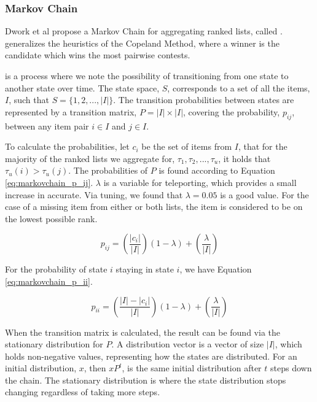 \subsubsection{Markov Chain}\label{sec:markovchain}

Dwork et al propose a Markov Chain for aggregating ranked lists, called \MC\cite{rank:aggregation}. \MC generalizes the heuristics of the Copeland Method, where a winner is the candidate which wins the most pairwise contests\cite{saari1996}.

\MC is a process where we note the possibility of transitioning from one state to another state over time. The \MC state space, $S$, corresponds to a set of all the items, $I$, such that $S = \{1, 2,..., |I|\}$. The transition probabilities between states are represented by a transition matrix, $P = |I| \times |I|$, covering the probability, $p_{ij}$, between any item pair $i \in I$ and $j \in I$.

To calculate the probabilities, let $c_i$ be the set of items from $I$, that for the majority of the ranked lists we aggregate for, $\tau_1, \tau_2, ...,\tau_u$, it holds that $\tau_u(i) > \tau_u(j)$. The probabilities of $P$ is found according to Equation \ref{eq:markovchain_p_ij}. $\lambda$ is a variable for teleporting, which provides a small increase in accurate. Via tuning, we found that $\lambda = 0.05$ is a good value. For the case of a missing item from either or both lists, the item is considered to be on the lowest possible rank.

\begin{equation}\label{eq:markovchain_p_ij}
p_{ij} = (\frac{|c_i|}{|I|})(1-\lambda)+(\frac{\lambda}{|I|})
\end{equation}

For the probability of state $i$ staying in state $i$, we have Equation \ref{eq:markovchain_p_ii}.

\begin{equation}\label{eq:markovchain_p_ii}
p_{ii} = (\frac{|I|-|c_i|}{|I|})(1-\lambda)+(\frac{\lambda}{|I|})
\end{equation}

When the transition matrix is calculated, the result can be found via the stationary distribution for $P$. A distribution vector is a vector of size $|I|$, which holds non-negative values, representing how the states are distributed. For an initial distribution, $x$, then $xP^t$, is the same initial distribution after $t$ steps down the chain. The stationary distribution is where the state distribution stops changing regardless of taking more steps.

